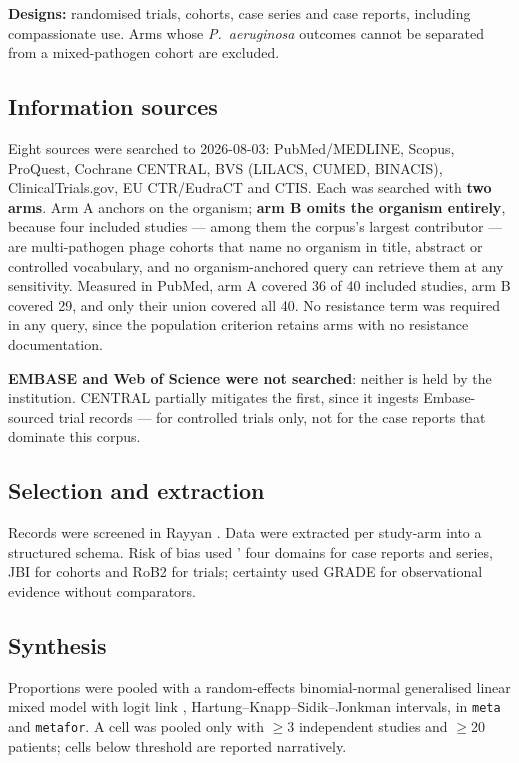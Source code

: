 \documentclass[12pt]{article}
\begin{document}
\textbf{Designs:} randomised trials, cohorts, case series and case reports, including compassionate use. Arms whose \textit{P.\ aeruginosa} outcomes cannot be separated from a mixed-pathogen cohort are excluded.

\subsection*{Information sources}

Eight sources were searched to 2026-08-03: PubMed/MEDLINE, Scopus, ProQuest, Cochrane CENTRAL, BVS (LILACS, CUMED, BINACIS), ClinicalTrials.gov, EU CTR/EudraCT and CTIS. Each was searched with \textbf{two arms}. Arm A anchors on the organism; \textbf{arm B omits the organism entirely}, because four included studies --- among them the corpus's largest contributor \parencite{Pirnay2024_natmicrobiol} --- are multi-pathogen phage cohorts that name no organism in title, abstract or controlled vocabulary, and no organism-anchored query can retrieve them at any sensitivity. Measured in PubMed, arm A covered 36 of 40 included studies, arm B covered 29, and only their union covered all 40. No resistance term was required in any query, since the population criterion retains arms with no resistance documentation.

\textbf{EMBASE and Web of Science were not searched}: neither is held by the institution. CENTRAL partially mitigates the first, since it ingests Embase-sourced trial records --- for controlled trials only, not for the case reports that dominate this corpus.

\subsection*{Selection and extraction}

Records were screened in Rayyan \parencite{Ouzzani2016_rayyan}. Data were extracted per study-arm into a structured schema. Risk of bias used \textcite{Murad2018_casereports}' four domains for case reports and series, JBI \parencite{Munn2020_jbicaseseries} for cohorts and RoB2 for trials; certainty used GRADE for observational evidence without comparators.

\subsection*{Synthesis}

Proportions were pooled with a random-effects binomial-normal generalised linear mixed model with logit link \parencite{Hamza2008_binomial,Nyaga2014_metaprop}, Hartung--Knapp--Sidik--Jonkman intervals, in \texttt{meta} and \texttt{metafor}. A cell was pooled only with $\ge$3 independent studies and $\ge$20 patients; cells below threshold are reported narratively.
\end{document}
